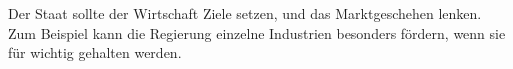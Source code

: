 Der Staat sollte der Wirtschaft Ziele setzen, und das Marktgeschehen lenken.
Zum Beispiel kann die Regierung einzelne Industrien besonders fördern, wenn sie für wichtig gehalten werden.